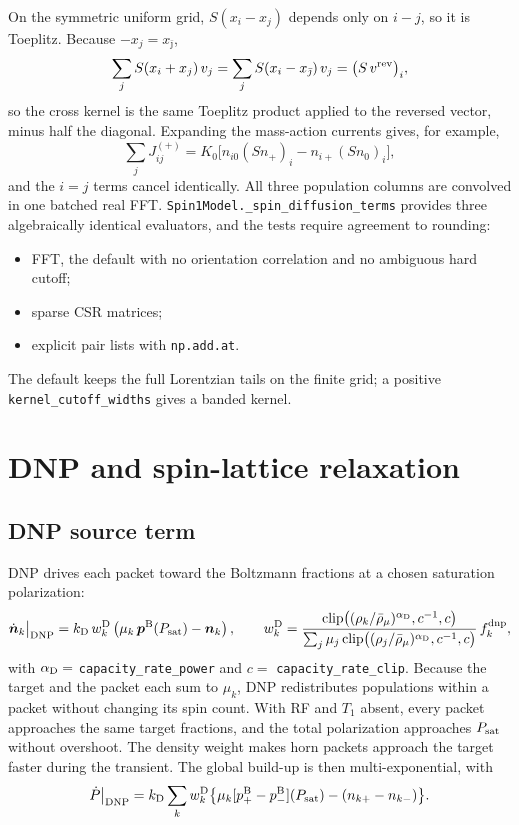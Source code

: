 \documentclass[11pt]{article}
\newcommand{\clip}{\operatorname{clip}}
\newcommand{\code}[1]{\texttt{#1}}
\begin{document}
On the symmetric uniform grid, \(S(x_i-x_j)\) depends only on \(i-j\), so it is Toeplitz. Because
\(-x_j=x_{\bar\jmath}\),
\begin{equation}
\sum_j S(x_i+x_j)\,v_j=\sum_j S(x_i-x_{\bar\jmath})\,v_j=\bigl(S\,v^{\rm rev}\bigr)_i,
\end{equation}
so the cross kernel is the same Toeplitz product applied to the reversed vector, minus half the
diagonal. Expanding the mass-action currents gives, for example,
\begin{equation}
\textstyle\sum_jJ^{(+)}_{ij}=K_0\bigl[n_{i0}(Sn_+)_i-n_{i+}(Sn_0)_i\bigr],
\end{equation}
and the \(i=j\) terms cancel identically. All three population columns are convolved in one
batched real FFT. \code{Spin1Model.\_spin\_diffusion\_terms} provides three algebraically
identical evaluators, and the tests require agreement to rounding:
\begin{itemize}
\item FFT, the default with no orientation correlation and no ambiguous hard cutoff;
\item sparse CSR matrices;
\item explicit pair lists with \code{np.add.at}.
\end{itemize}
The default keeps the full Lorentzian tails on the finite grid; a positive
\code{kernel\_cutoff\_widths} gives a banded kernel.

\section{DNP and spin-lattice relaxation}
\label{sec:dnp}

\subsection{DNP source term}

DNP drives each packet toward the Boltzmann fractions at a chosen saturation polarization:
\begin{equation}
  \dot{\bm n}_k\big|_{\rm DNP}
  =k_{\rm D}\,w^{\rm D}_k\left(\mu_k\,\bm p^{\rm B}(P_{\rm sat})-\bm n_k\right),
  \qquad
  w^{\rm D}_k=\frac{\clip\bigl((\rho_k/\bar\rho_\mu)^{\alpha_{\rm D}},c^{-1},c\bigr)}
  {\sum_j\mu_j\clip\bigl((\rho_j/\bar\rho_\mu)^{\alpha_{\rm D}},c^{-1},c\bigr)}\,f^{\rm dnp}_k,
  \label{eq:dnpterm}
\end{equation}
with \(\alpha_{\rm D}=\) \code{capacity\_rate\_power} and \(c=\) \code{capacity\_rate\_clip}. Because
the target and the packet each sum to \(\mu_k\), DNP redistributes populations within a packet
without changing its spin count. With RF and \(T_1\) absent, every packet approaches the same
target fractions, and the total polarization approaches \(P_{\rm sat}\) without overshoot. The
density weight makes horn packets approach the target faster during the transient. The global
build-up is then multi-exponential, with
\begin{equation}
\dot P\big|_{\rm DNP}=k_{\rm D}\sum_kw^{\rm D}_k\bigl\{\mu_k[p^{\rm B}_+-p^{\rm B}_-](P_{\rm sat})-(n_{k+}-n_{k-})\bigr\}.
\end{equation}
\end{document}
